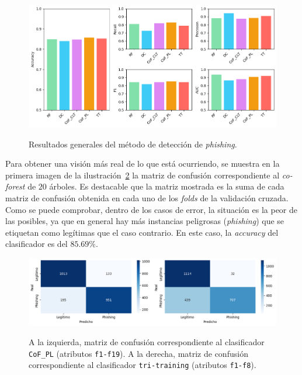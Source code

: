\begin{figure}[h]
	\caption[\textit{Phishing}: detección (\texttt{f1-f19})]{Resultados generales del método de detección de \textit{phishing}.}
	\centering
	\includegraphics[width=\textwidth]{../img/memoria/5_phishing/f1f19_all_big}
	\label{gr:ph-f1f19-all}
\end{figure}

Para obtener una visión más real de lo que está ocurriendo, se muestra en la primera imagen de la ilustración~\ref{gr:ph-f1f19_cof_clt_f1f8_tt} la matriz de confusión correspondiente al \textit{co-forest} de $20$ árboles. Es destacable que la matriz mostrada es la suma de cada matriz de confusión obtenida en cada uno de los \textit{folds} de la validación cruzada. Como se puede comprobar, dentro de los casos de error, la situación es la peor de las posibles, ya que en general hay más instancias peligrosas (\textit{phishing}) que se etiquetan como legítimas que el caso contrario. En este caso, la \textit{accuracy} del clasificador es del $85$.$69\%$.

\begin{figure}[h]
	\caption[\textit{Phishing}: detección (\texttt{f1-f19} y \texttt{f1-f8}, matrices de confusión)]{A la izquierda, matriz de confusión correspondiente al clasificador \texttt{CoF\_PL} (atributos \texttt{f1-f19}). A la derecha, matriz de confusión correspondiente al clasificador \texttt{tri-training} (atributos \texttt{f1-f8}).}
	\centering
	\includegraphics[width=\textwidth]{../img/memoria/5_phishing/f1f19_cof_clt_f1f8_tt}
	\label{gr:ph-f1f19_cof_clt_f1f8_tt}
\end{figure}


